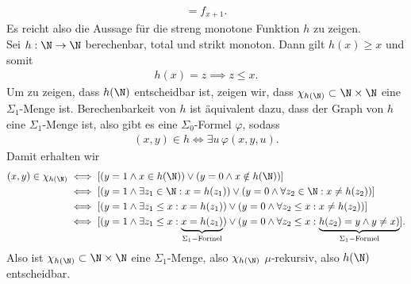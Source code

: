 \begin{solution}
\begin{enumerate}[label = Fall \arabic*:]
\begin{align*}
				= f_{x+1}.
			\end{align*}
			Es reicht also die Aussage für die streng monotone Funktion $h$ zu zeigen. \\
			Sei $h: \N \to \N$ berechenbar, total und strikt monoton. Dann gilt $h(x) \geq x$
			und somit
			\begin{align*}
				h(x) = z \implies z \leq x.
			\end{align*}
			Um zu zeigen, dass $h(\N)$ entscheidbar ist, zeigen wir, dass
			$\chi_{h(\N)} \subset \N \times \N$ eine $\Sigma_1$-Menge ist.
			Berechenbarkeit von $h$ ist äquivalent dazu, dass der Graph von $h$ eine
			$\Sigma_1$-Menge ist, also gibt es eine $\Sigma_0$-Formel $\varphi$, sodass
			\begin{align*}
				(x,y) \in h \iff \exists u\, \varphi(x,y,u).
			\end{align*}
			Damit erhalten wir
			\begin{align*}
				(x,y) \in \chi_{h(\N)} &\iff [(y = 1 \land x \in h(\N))
				\lor (y = 0 \land x \notin h(\N))] \\
				&\iff [(y = 1 \land \exists z_1 \in \N: x = h(z_1))
				\lor (y = 0 \land \forall z_2 \in \N: x \neq h(z_2))] \\
				&\iff [(y = 1 \land \exists z_1 \leq x: x = h(z_1))
				\lor (y = 0 \land \forall z_2 \leq x: x \neq h(z_2))] \\
				&\iff [(y = 1 \land \exists z_1 \leq x: \underbrace{x = h(z_1)}_{\Sigma_1-\text{Formel}})
				\lor (y = 0 \land \forall z_2 \leq x: \underbrace{h(z_2) = y \land y \neq x)}_{\Sigma_1-\text{Formel}}].
			\end{align*}
		Also ist $\chi_{h(\N)} \subset \N \times \N$ eine $\Sigma_1$-Menge, also
		$\chi_{h(\N)}$ $\mu$-rekursiv, also $h(\N)$ entscheidbar.
	\end{enumerate}

\end{solution}

